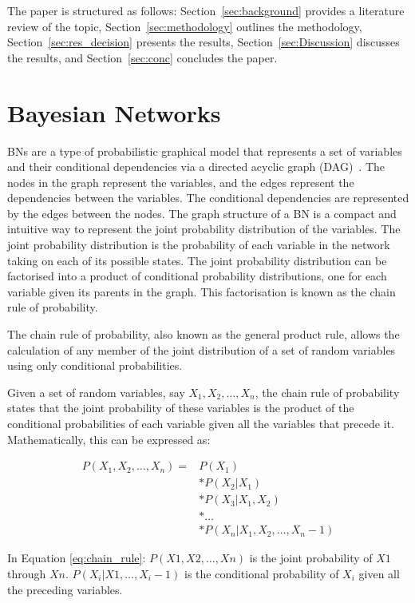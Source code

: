 \documentclass[journal]{IEEEtran}
\begin{document}
The paper is structured as follows: Section~\ref{sec:background} provides a literature review of the topic, Section~\ref{sec:methodology} outlines the methodology, Section~\ref{sec:res_decision} presents the results, Section~\ref{sec:Discussion} discusses the results, and Section~\ref{sec:conc} concludes the paper. 

\section{Bayesian Networks}\label{sec:BNs}

BNs are a type of probabilistic graphical model that represents a set of variables and their conditional dependencies via a directed acyclic graph (DAG)~\cite{Hand2001}. The nodes in the graph represent the variables, and the edges represent the dependencies between the variables. The conditional dependencies are represented by the edges between the nodes. The graph structure of a BN is a compact and intuitive way to represent the joint probability distribution of the variables. The joint probability distribution is the probability of each variable in the network taking on each of its possible states. The joint probability distribution can be factorised into a product of conditional probability distributions, one for each variable given its parents in the graph. This factorisation is known as the chain rule of probability.

The chain rule of probability, also known as the general product rule, allows the calculation of any member of the joint distribution of a set of random variables using only conditional probabilities.

Given a set of random variables, say $X_1, X_2, \ldots, X_n$, the chain rule of probability states that the joint probability of these variables is the product of the conditional probabilities of each variable given all the variables that precede it. Mathematically, this can be expressed as:

\begin{align}
    P(X_1, X_2, \ldots, X_n) = & P(X_1) \nonumber \\
    & * P(X_2 | X_1) \nonumber \\
    & * P(X_3 | X_1, X_2) \nonumber \\
    & * \ldots \nonumber \\
    & * P(X_n | X_1, X_2, \ldots, X_n-1)
    \label{eq:chain_rule}
\end{align}
    
In Equation \ref{eq:chain_rule}: $P(X1, X2, \ldots, Xn)$ is the joint probability of $X1$ through $Xn$. $P(X_i | X1, \ldots, X_i-1)$ is the conditional probability of $X_i$ given all the preceding variables.
\end{document}
